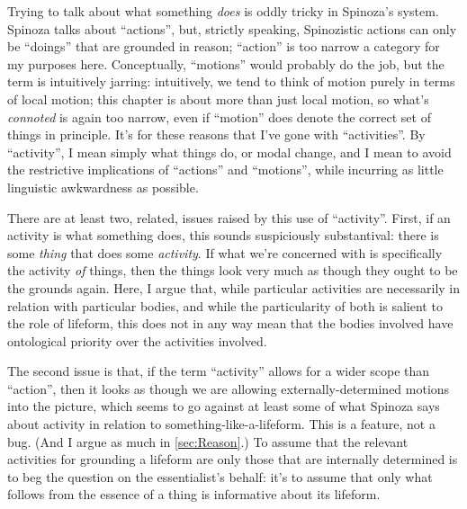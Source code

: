 \documentclass{article}
\begin{document}
Trying to talk about what something \emph{does} is oddly tricky in Spinoza's system. Spinoza talks about \enquote{actions}, but, strictly speaking, Spinozistic actions can only be \enquote{doings} that are grounded in reason; \enquote{action} is too narrow a category for my purposes here. Conceptually, \enquote{motions} would probably do the job, but the term is intuitively jarring: intuitively, we tend to think of motion purely in terms of local motion; this chapter is about more than just local motion, so what's \emph{connoted} is again too narrow, even if \enquote{motion} does denote the correct set of things in principle. It's for these reasons that I've gone with \enquote{activities}. By \enquote{activity}, I mean simply what things do, or modal change, and I mean to avoid the restrictive implications of \enquote{actions} and \enquote{motions}, while incurring as little linguistic awkwardness as possible.

There are at least two, related, issues raised by this use of \enquote{activity}. First, if an activity is what something does, this sounds suspiciously substantival: there is some \emph{thing} that does some \emph{activity}. If what we're concerned with is specifically the activity \emph{of} things, then the things look very much as though they ought to be the grounds again. Here, I argue that, while particular activities are necessarily in relation with particular bodies, and while the particularity of both is salient to the role of lifeform, this does not in any way mean that the bodies involved have ontological priority over the activities involved.

The second issue is that, if the term \enquote{activity} allows for a wider scope than \enquote{action}, then it looks as though we are allowing externally-determined motions into the picture, which seems to go against at least some of what Spinoza says about activity in relation to something-like-a-lifeform. This is a feature, not a bug. (And I argue as much in \cref{sec:Reason}.) To assume that the relevant activities for grounding a lifeform are only those that are internally determined is to beg the question on the essentialist's behalf: it's to assume that only what follows from the essence of a thing is informative about its lifeform.

\end{document}
